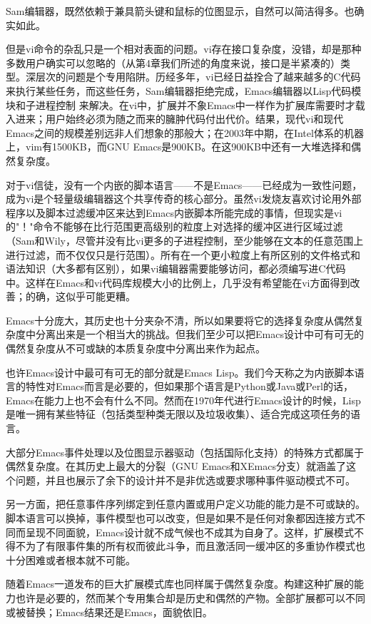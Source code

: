 \documentclass[12pt,oneside]{book}
\begin{document}
Sam编辑器，既然依赖于兼具箭头键和鼠标的位图显示，自然可以简洁得多。也确实如此。

但是vi命令的杂乱只是一个相对表面的问题。vi存在接口复杂度，没错，却是那种多数用户确实可以忽略的（从第4章我们所述的角度来说，接口是半紧凑的）类型。深层次的问题是个专用陷阱。历经多年，vi已经日益拴合了越来越多的C代码来执行某些任务，而这些任务，Sam编辑器拒绝完成，Emacs编辑器以Lisp代码模块和子进程控制
来解决。在vi中，扩展并不象Emacs中一样作为扩展库需要时才载入进来；用户始终必须为随之而来的臃肿代码付出代价。结果，现代vi和现代Emacs之间的规模差别远非人们想象的那般大；在2003年中期，在Intel体系的机器上，vim有1500KB，而GNU Emacs是900KB。在这900KB中还有一大堆选择和偶然复杂度。

对于vi信徒，没有一个内嵌的脚本语言——不是Emacs——已经成为一致性问题，成为vi是个轻量级编辑器这个共享传奇的核心部分。虽然vi发烧友喜欢讨论用外部程序以及脚本过滤缓冲区来达到Emacs内嵌脚本所能完成的事情，但现实是vi的"！"命令不能够在比行范围更高级别的粒度上对选择的缓冲区进行区域过滤（Sam和Wily，尽管并没有比vi更多的子进程控制，至少能够在文本的任意范围上进行过滤，而不仅仅只是行范围）。所有在一个更小粒度上有所区别的文件格式和语法知识（大多都有区别），如果vi编辑器需要能够访问，都必须编写进C代码中。这样在Emacs和vi代码库规模大小的比例上，几乎没有希望能在vi方面得到改善；的确，这似乎可能更糟。

Emacs十分庞大，其历史也十分夹杂不清，所以如果要将它的选择复杂度从偶然复杂度中分离出来是一个相当大的挑战。但我们至少可以把Emacs设计中可有可无的偶然复杂度从不可或缺的本质复杂度中分离出来作为起点。

也许Emacs设计中最可有可无的部分就是Emacs Lisp。我们今天称之为内嵌脚本语言的特性对Emacs而言是必要的，但如果那个语言是Python或Java或Perl的话，Emacs在能力上也不会有什么不同。然而在1970年代进行Emacs设计的时候，Lisp是唯一拥有某些特征（包括类型种类无限以及垃圾收集）、适合完成这项任务的语言。

大部分Emacs事件处理以及位图显示器驱动（包括国际化支持）的特殊方式都属于偶然复杂度。在其历史上最大的分裂（GNU Emacs和XEmacs分支）就涵盖了这个问题，并且也展示了余下的设计并不是非优选或要求哪种事件驱动模式不可。

另一方面，把任意事件序列绑定到任意内置或用户定义功能的能力是不可或缺的。脚本语言可以换掉，事件模型也可以改变，但是如果不是任何对象都因连接方式不同而呈现不同面貌，Emacs设计就不成气候也不成其为自身了。这样，扩展模式不得不为了有限事件集的所有权而彼此斗争，而且激活同一缓冲区的多重协作模式也十分困难或者根本就不可能。

随着Emacs一道发布的巨大扩展模式库也同样属于偶然复杂度。构建这种扩展的能力也许是必要的，然而某个专用集合却是历史和偶然的产物。全部扩展都可以不同或被替换；Emacs结果还是Emacs，面貌依旧。
\end{document}
